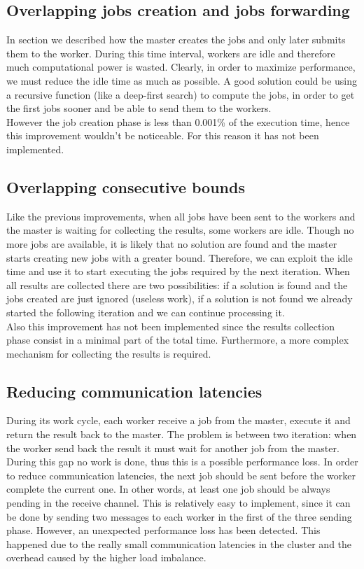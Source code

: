\documentclass{article}
\begin{document}
\subsection{Overlapping jobs creation and jobs forwarding}
In section  we described how the master creates the jobs and only later submits them to the worker. During this time interval, workers are idle and therefore much computational power is wasted. Clearly, in order to maximize performance, we must reduce the idle time as much as possible. A good solution could be using a recursive function (like a deep-first search) to compute the jobs, in order to get the first jobs sooner and be able to send them to the workers. \\
However the job creation phase is less than 0.001\% of the execution time, hence this improvement wouldn't be noticeable. For this reason it has not been implemented.


\subsection{Overlapping consecutive bounds}
Like the previous improvements, when all jobs have been sent to the workers and the master is waiting for collecting the results, some workers are idle. Though no more jobs are available, it is likely that no solution are found and the master starts creating new jobs with a greater bound. Therefore, we can exploit the idle time and use it to start executing the jobs required by the next iteration. When all results are collected there are two possibilities: if a solution is found and the jobs created are just ignored (useless work), if a solution is not found we already started the following iteration and we can continue processing it. \\
Also this improvement has not been implemented since the results collection phase consist in a minimal part of the total time. Furthermore, a more complex mechanism for collecting the results is required.


\subsection{Reducing communication latencies}
During its work cycle, each worker receive a job from the master, execute it and return the result back to the master. The problem is between two iteration: when the worker send back the result it must wait for another job from the master. During this gap no work is done, thus this is a possible performance loss. In order to reduce communication latencies, the next job should be sent before the worker complete the current one. In other words, at least one job should be always pending in the receive channel. This is relatively easy to implement, since it can be done by sending two messages to each worker in the first of the three sending phase. However, an unexpected performance loss has been detected. This happened due to the really small communication latencies in the cluster and the overhead caused by the higher load imbalance.
\end{document}
